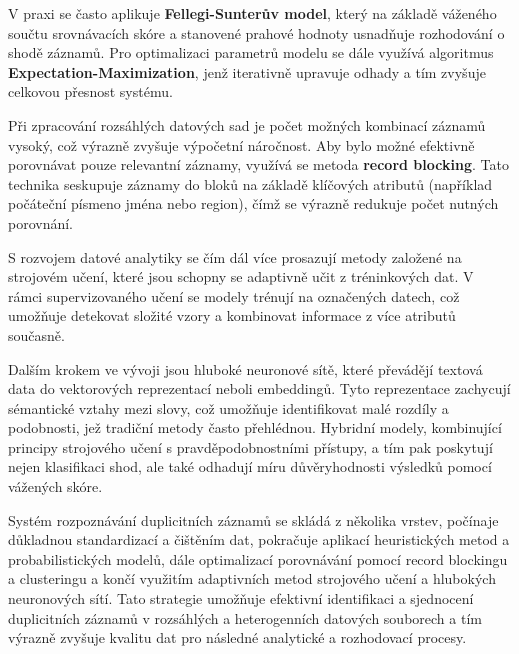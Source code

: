 V praxi se často aplikuje \textbf{Fellegi-Sunterův model}, který na základě váženého součtu srovnávacích skóre a stanovené prahové hodnoty usnadňuje rozhodování o shodě záznamů. Pro optimalizaci parametrů modelu se dále využívá algoritmus
\textbf{Expectation-Maximization}, jenž iterativně upravuje odhady a tím zvyšuje celkovou přesnost systému.

Při zpracování rozsáhlých datových sad je počet možných kombinací záznamů vysoký, což výrazně zvyšuje výpočetní náročnost. Aby bylo možné efektivně porovnávat pouze relevantní záznamy, využívá se metoda \textbf{record blocking}. Tato technika seskupuje záznamy do bloků na základě klíčových atributů (například počáteční písmeno jména nebo region), čímž se výrazně redukuje počet nutných porovnání.

S rozvojem datové analytiky se čím dál více prosazují metody založené na strojovém učení, které jsou schopny se adaptivně učit z tréninkových dat. V rámci supervizovaného učení se modely trénují na označených datech, což umožňuje detekovat složité vzory a kombinovat informace z více atributů současně.

Dalším krokem ve vývoji jsou hluboké neuronové sítě, které převádějí textová data do vektorových reprezentací neboli embeddingů. Tyto reprezentace zachycují sémantické vztahy mezi slovy, což umožňuje identifikovat malé rozdíly a podobnosti, jež tradiční metody často přehlédnou. Hybridní modely, kombinující principy strojového učení s pravděpodobnostními přístupy, a tím pak poskytují nejen klasifikaci shod, ale také odhadují míru důvěryhodnosti výsledků pomocí vážených skóre.

Systém rozpoznávání duplicitních záznamů se skládá z několika vrstev, počínaje důkladnou standardizací a čištěním dat, pokračuje aplikací heuristických metod a probabilistických modelů, dále optimalizací porovnávání pomocí record blockingu a clusteringu a končí využitím adaptivních metod strojového učení a hlubokých neuronových sítí. Tato strategie umožňuje efektivní identifikaci a sjednocení duplicitních záznamů v rozsáhlých a heterogenních datových souborech a tím výrazně zvyšuje kvalitu dat pro následné analytické a rozhodovací procesy.


